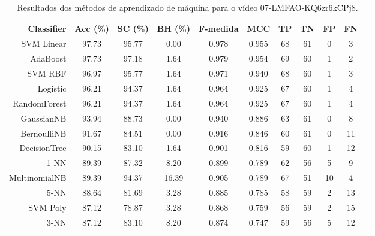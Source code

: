 \begin{table}[!htb]
\centering
\caption{Resultados dos métodos de aprendizado de máquina para o vídeo 07-LMFAO-KQ6zr6kCPj8.}
\label{tab:07-LMFAO-KQ6zr6kCPj8}
\begin{tabular}{r|c|c|c|c|c|c|c|c|c|c}
\hline\hline
Classifier & Acc (\%) & SC (\%) & BH (\%) & F-medida & MCC & TP & TN & FP & FN \\ \hline
SVM Linear & 97.73 & 95.77 & 0.00 & 0.978 & 0.955 & 68 & 61 & 0 & 3 \\ 
AdaBoost & 97.73 & 97.18 & 1.64 & 0.979 & 0.954 & 69 & 60 & 1 & 2 \\ 
SVM RBF & 96.97 & 95.77 & 1.64 & 0.971 & 0.940 & 68 & 60 & 1 & 3 \\ 
Logistic & 96.21 & 94.37 & 1.64 & 0.964 & 0.925 & 67 & 60 & 1 & 4 \\ 
RandomForest & 96.21 & 94.37 & 1.64 & 0.964 & 0.925 & 67 & 60 & 1 & 4 \\ 
GaussianNB & 93.94 & 88.73 & 0.00 & 0.940 & 0.886 & 63 & 61 & 0 & 8 \\ 
BernoulliNB & 91.67 & 84.51 & 0.00 & 0.916 & 0.846 & 60 & 61 & 0 & 11 \\ 
DecisionTree & 90.15 & 83.10 & 1.64 & 0.901 & 0.816 & 59 & 60 & 1 & 12 \\ 
1-NN & 89.39 & 87.32 & 8.20 & 0.899 & 0.789 & 62 & 56 & 5 & 9 \\ 
MultinomialNB & 89.39 & 94.37 & 16.39 & 0.905 & 0.789 & 67 & 51 & 10 & 4 \\ 
5-NN & 88.64 & 81.69 & 3.28 & 0.885 & 0.785 & 58 & 59 & 2 & 13 \\ 
SVM Poly & 87.12 & 78.87 & 3.28 & 0.868 & 0.759 & 56 & 59 & 2 & 15 \\ 
3-NN & 87.12 & 83.10 & 8.20 & 0.874 & 0.747 & 59 & 56 & 5 & 12 \\ 
\hline\hline
\end{tabular}
\end{table}
